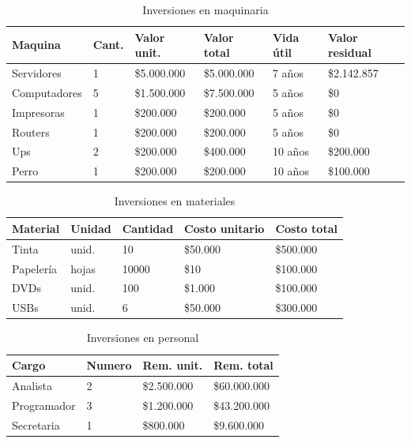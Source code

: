 \documentclass[a4paper, 12pt, oneside]{article}
\begin{document}
	\begin{table}
		\caption{Inversiones en maquinaria}
		\begin{tabular}{ | p{3cm} | p{1cm} | p{2.5cm} | p{2.5cm} | p{1cm} | p{2cm} | }
		\hline
		Maquina & Cant. & Valor unit. & Valor total & Vida útil & Valor residual \\
		\hline					
		Servidores & 1 & \$5.000.000 & \$5.000.000 & 7 años & \$2.142.857 \\
		\hline					
		Computadores & 5 & \$1.500.000 & \$7.500.000 & 5 años & \$0 \\
		\hline
		Impresoras & 1 & \$200.000 & \$200.000 & 5 años & \$0 \\ 
		\hline
		Routers & 1 & \$200.000 & \$200.000 & 5 años & \$0 \\
		\hline
		Ups & 2 & \$200.000 & \$400.000 & 10 años & \$200.000 \\
		\hline
		Perro & 1 & \$200.000 & \$200.000 & 10 años & \$100.000 \\
		\hline
		\end{tabular}
		\label{tb:invMaquinaria}
	\end{table}

	\begin{table}
		\caption{Inversiones en materiales}
		\begin{tabular}{ | p{3cm} | p{1.5cm} | p{1.5cm} | p{2cm} | p{2cm} | }
		\hline
		Material & Unidad & Cantidad & Costo unitario & Costo total \\
		\hline
		Tinta & unid. & 10 & \$50.000 & \$500.000 \\ 
		\hline					
		Papelería & hojas & 10000 & \$10 & \$100.000 \\
		\hline
		DVDs & unid. & 100 & \$1.000 & \$100.000 \\
		\hline
		USBs & unid. & 6 & \$50.000 & \$300.000 \\
		\hline
		\end{tabular}
		\label{tb:invMateriales}
	\end{table}

	\begin{table}
		\caption{Inversiones en personal}
		\begin{tabular}{ | p{3cm} | p{2cm} | p{2cm} | p{2cm} | }
		\hline
		Cargo & Numero & Rem. unit. & Rem. total \\
		\hline
		Analista & 2 & \$2.500.000 & \$60.000.000 \\
		\hline					
		Programador & 3 & \$1.200.000 & \$43.200.000 \\
		\hline
		Secretaria & 1 & \$800.000 & \$9.600.000 \\
		\hline
		\end{tabular}
		\label{tb:invPersonal}
	\end{table}
\end{document}
